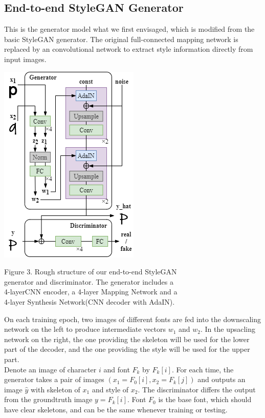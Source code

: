 \documentclass[letterpaper]{article}
\begin{document}
\subsection{End-to-end StyleGAN Generator}
This is the generator model what we first envisaged, which is modified from the basic StyleGAN generator. The original full-connected mapping network is replaced by an convolutional network to extract style information directly from input images.
\\
\begin{center}
    \includegraphics[]{update-fig-model.png}

    Figure 3. Rough structure of our end-to-end StyleGAN\\generator and discriminator. The generator includes a\\4-layerCNN encoder, a 4-layer Mapping Network and a\\4-layer Synthesis Network(CNN decoder with AdaIN).
\end{center}
On each training epoch, two images of different fonts are fed into the downscaling network on the left to produce intermediate vectors $w_1$ and $w_2$. In the upsacling network on the right, the one providing the skeleton will be used for the lower part of the decoder, and the one providing the style will be used for the upper part.
\\
Denote an image of character $i$ and font $F_k$ by $F_k[i]$. For each time, the generator takes a pair of images $(x_1=F_0[i], x_2=F_k[j])$ and outputs an image $\hat{y}$ with skeleton of $x_1$ and style of $x_2$. The discriminator differs the output from the groundtruth image $y=F_k[i]$. Font $F_0$ is the base font, which should have clear skeletons, and can be the same whenever training or testing.
\end{document}

